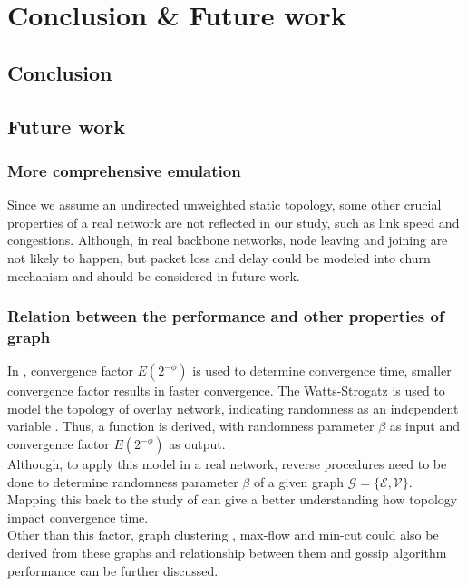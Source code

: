 \section{Conclusion \& Future work}
\label{sec:conclusion}

\subsection{Conclusion}

\subsection{Future work}
\subsubsection{More comprehensive emulation}
Since we assume an undirected unweighted static topology, some other crucial properties of a real network are not reflected in our study, such as link speed and congestions. Although, in real backbone networks, node leaving and joining are not likely to happen, but packet loss and delay could be modeled into churn mechanism and should be considered in future work.\\

\subsubsection{Relation between the performance and other properties of graph}
In \cite{jelasity_gossip-based_2005}, convergence factor $E(2^{-\phi})$ is used to determine convergence time, smaller convergence factor results in faster convergence. The Watts-Strogatz is used to model the topology of overlay network, indicating randomness as an independent variable \cite{Watts1998}. Thus, a function is derived, with randomness parameter $\beta$ as input and convergence factor $E(2^{-\phi})$ as output.\\
Although, to apply this model in a real network, reverse procedures need to be done to determine randomness parameter $\beta$ of a given graph $\mathcal{G}=\{\mathcal{E}, \mathcal{V}\}$. Mapping this back to the study of \cite{jelasity_gossip-based_2005} can give a better understanding how topology impact convergence time.\\
Other than this factor, graph clustering \cite{Schaeffer200727}, max-flow and min-cut \cite{PapadimitriouS82} could also be derived from these graphs and relationship between them and gossip algorithm performance can be further discussed.\\
